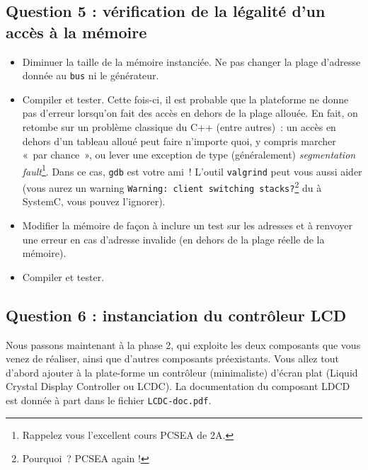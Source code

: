 \documentclass[12pt,a4paper]{article}
\begin{document}
\subsection*{Question 5 : vérification de la légalité d'un accès à la mémoire}

\begin{itemize}
\item Diminuer la taille de la mémoire instanciée.
      Ne pas changer la plage d'adresse donnée au \lstinline|bus| ni le générateur.\vv
\item Compiler et tester.
      Cette fois-ci, il est probable que la plateforme ne donne pas d'erreur lorsqu'on fait des accès en dehors de la plage allouée.
      En fait, on retombe sur un problème classique du C++ (entre autres)~: un accès en dehors d'un tableau alloué peut faire n'importe quoi, y compris marcher «~par chance~», ou lever une exception de type (généralement) \emph{segmentation fault}\footnote{Rappelez vous l'excellent cours PCSEA de 2A.}.
      Dans ce cas, \verb+gdb+ est votre ami~!
      L'outil \verb|valgrind| peut vous aussi aider (vous aurez un warning {\tt Warning: client switching stacks?}\footnote{Pourquoi~? PCSEA again !} du à SystemC, vous pouvez l'ignorer).
\item Modifier la mémoire de façon à inclure un test sur les adresses et à renvoyer une erreur en cas d'adresse invalide (en dehors de la plage réelle de la mémoire).\vv
\item Compiler et tester.
\end{itemize}

\subsection*{Question 6 : instanciation du contrôleur LCD}
Nous passons maintenant à la phase 2, qui exploite les deux composants que vous venez de réaliser, ainsi que d'autres composants préexistants.
Vous allez tout d'abord ajouter à la plate-forme un contrôleur (minimaliste) d'écran plat (Liquid Crystal Display Controller ou LCDC).
La documentation du composant LDCD est donnée à part dans le fichier \texttt{LCDC-doc.pdf}.
\end{document}
